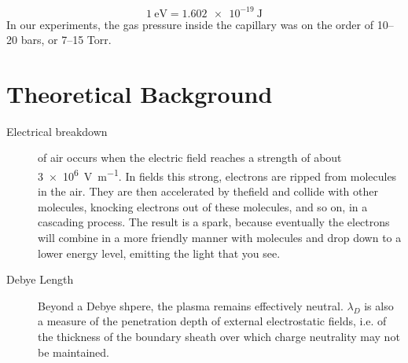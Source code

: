 \documentclass[openany]{book}
\begin{document}
$$\SI{1}{\electronvolt}=\SI{1.602e-19}{\joule}$$
In our experiments, the gas pressure inside the capillary was on the order of \numrange[range-phrase = --]{10}{20} bars, or \numrange[range-phrase = --]{7}{15} Torr.
\chapter{Theoretical Background}
\begin{description}
\item[Electrical  breakdown] of air occurs when the electric field reaches a strength of about \SI{3e6}{\volt\per\m}. In fields this strong, electrons are ripped from molecules in the air. They are then accelerated by thefield and collide with other molecules, knocking electrons out of these molecules,  and  so  on,  in  a  cascading  process.  The  result  is  a spark, because eventually the electrons will combine in a more friendly manner with molecules and drop down to a lower energy level, emitting the light that you see.
\item[Debye Length] Beyond a Debye shpere, the plasma remains effectively neutral. $\lambda_D$ is also a measure of the penetration depth of external electrostatic fields, i.e. of the thickness of the boundary sheath over which charge neutrality may not be maintained.


\end{description}
\end{document}
